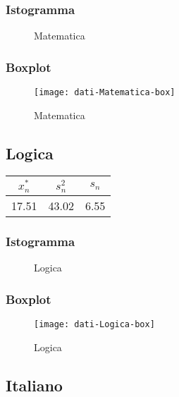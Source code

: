 \subsubsection{Istogramma}
\begin{figure}[!h]
  \caption{Matematica}
\end{figure}

\subsubsection{Boxplot}
\begin{figure}[!h]
  \centering
  \texttt{[image: dati-Matematica-box]}
  \caption{Matematica}
\end{figure}
\restoregeometry
\clearpage

\thispagestyle{empty} %
\subsection{Logica}

\begin{center}
\begin{tabular}{|c|c|c|}
  \hline
  \(x_{n}^{*}\) & \(s_n^2\) & \(s_n\) \\
  \hline
  17.51 & 43.02 & 6.55 \\
  \hline
\end{tabular}
\end{center}

\subsubsection{Istogramma}
\begin{figure}[!h]
  \caption{Logica}
\end{figure}

\subsubsection{Boxplot}
\begin{figure}[!h]
  \centering
  \texttt{[image: dati-Logica-box]}
  \caption{Logica}
\end{figure}
\restoregeometry
\clearpage

\thispagestyle{empty} %
\subsection{Italiano}

